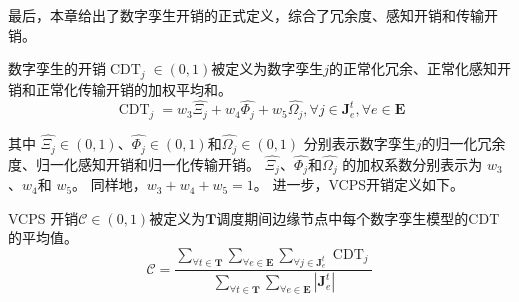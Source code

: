 最后，本章给出了数字孪生开销的正式定义，综合了冗余度、感知开销和传输开销。
\begin{definition}
数字孪生的开销$\operatorname{CDT}_{j} \in (0, 1)$被定义为数字孪生$j$的正常化冗余、正常化感知开销和正常化传输开销的加权平均和。
	\begin{equation}
	    \operatorname{CDT}_{j} = w_3  \hat{\Xi_{j}} +  w_4 \hat{\Phi_{j}} + w_5 \hat{\Omega_{j}}, \forall j \in \mathbf{J}_{e}^t, \forall e \in \mathbf{E}
	\end{equation}
\end{definition}
\noindent 其中 $\hat{\Xi_{j}}\in (0, 1)$、$\hat{\Phi_{j}} \in (0, 1)$和$\hat{\Omega_{j}} \in (0, 1)$ 分别表示数字孪生$j$的归一化冗余度、归一化感知开销和归一化传输开销。
$\hat{\Xi_{j}}$、$\hat{\Phi_{j}}$和$\hat{\Omega_{j}}$ 的加权系数分别表示为 $w_3$、$w_4$和 $w_5$。
同样地，$w_3+w_4+w_5=1$。
进一步，VCPS开销定义如下。
\begin{definition}
VCPS 开销$\mathscr{C} \in (0, 1)$被定义为$\mathbf{T}$调度期间边缘节点中每个数字孪生模型的CDT的平均值。
	\begin{equation}
		\mathscr{C}=\frac{\sum_{\forall t \in \mathbf{T}} \sum_{\forall e \in \mathbf{E}} \sum_{\forall j \in \mathbf{J}_e^t}  \operatorname{CDT}_{j}}{\sum_{\forall t \in \mathbf{T}} \sum_{\forall e \in \mathbf{E}} |\mathbf{J}_e^t| }
	\end{equation}
\end{definition}

